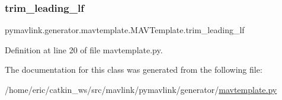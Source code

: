 \subsubsection{\texorpdfstring{trim\_leading\_lf}{trim\_leading\_lf}}
{\footnotesize\ttfamily pymavlink.\+generator.\+mavtemplate.\+M\+A\+V\+Template.\+trim\+\_\+leading\+\_\+lf}



Definition at line 20 of file mavtemplate.\+py.



The documentation for this class was generated from the following file\+:\begin{DoxyCompactItemize}
\item 
/home/eric/catkin\+\_\+ws/src/mavlink/pymavlink/generator/\mbox{\hyperlink{mavtemplate_8py}{mavtemplate.\+py}}\end{DoxyCompactItemize}
